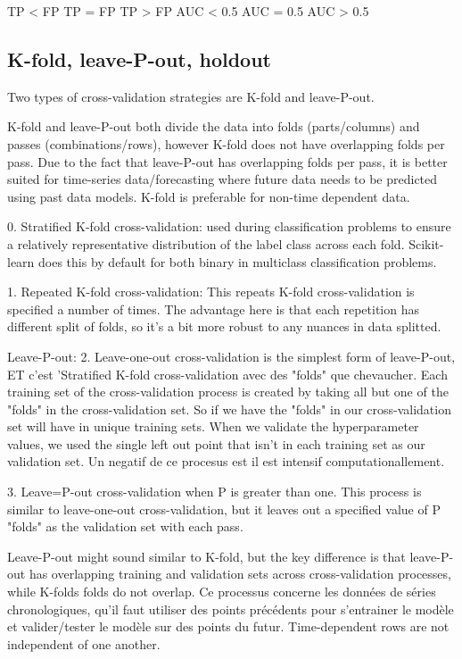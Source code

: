 \documentclass[11pt, onecolumn]{article}
\begin{document}
	TP < FP			TP = FP			TP > FP
	AUC < 0.5		AUC = 0.5		AUC > 0.5
 






\subsection{K-fold, leave-P-out, holdout}

Two types of cross-validation strategies are K-fold and leave-P-out. 

K-fold and leave-P-out both divide the data into folds (parts/columns) and passes (combinations/rows), however K-fold does not have overlapping folds per pass. Due to the fact that leave-P-out has overlapping folds per pass, it is better suited for time-series data/forecasting where future data needs to be predicted using past data models. K-fold is preferable for non-time dependent data.

0. Stratified K-fold cross-validation: used during classification problems to ensure a relatively representative distribution of the label class across each fold. Scikit-learn does this by default for both binary in multiclass classification problems.

1. Repeated K-fold cross-validation:  This repeats K-fold cross-validation is specified a number of times. The advantage here is that each repetition has different split of folds, so it's a bit more robust to any nuances in data splitted.

Leave-P-out:
2. Leave-one-out cross-validation is the simplest form of leave-P-out, ET c'est 'Stratified K-fold cross-validation avec des "folds" que chevaucher. Each training set of the cross-validation process is created by taking all but one of the "folds" in the cross-validation set. So if we have the "folds" in our cross-validation set will have in unique training sets.
When we validate the hyperparameter values, we used the single left out point that isn't in each training set as our validation set. Un negatif de ce procesus est il est intensif computationallement.

3. Leave=P-out cross-validation when P is greater than one. This process is similar to leave-one-out cross-validation, but
it leaves out a specified value of P "folds" as the validation set with each pass.

Leave-P-out might sound similar to K-fold, but the key difference is that leave-P-out has overlapping training and validation sets across cross-validation processes, while K-folds folds do not overlap. Ce processus concerne les données de séries chronologiques, qu'il faut utiliser des points précédents pour s'entrainer le modèle et valider/tester le modèle sur des points du futur. Time-dependent rows are not independent of one another.  
\end{document}
